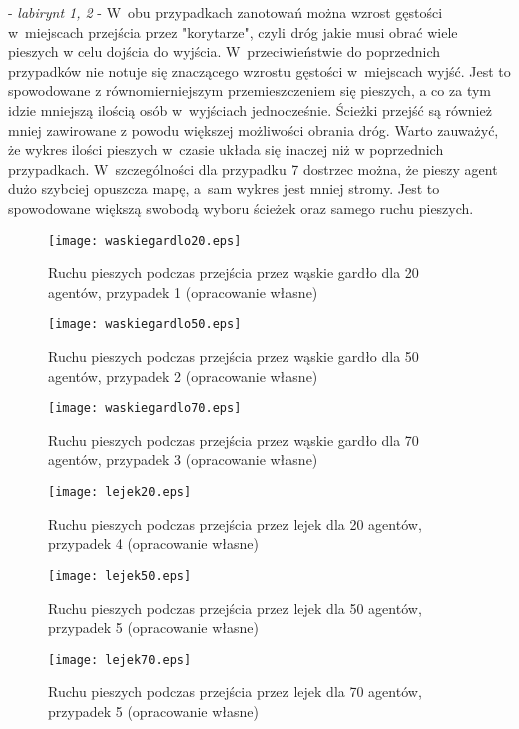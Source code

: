 - \textit{labirynt 1, 2} - W~obu przypadkach zanotowań można wzrost gęstości w~miejscach przejścia przez "korytarze", czyli dróg jakie musi obrać wiele pieszych w celu dojścia do wyjścia. W~przeciwieństwie do poprzednich przypadków nie notuje się znaczącego wzrostu gęstości w~miejscach wyjść. Jest to spowodowane z równomierniejszym przemieszczeniem się pieszych, a co za tym idzie mniejszą ilością osób w~wyjściach jednocześnie. Ścieżki przejść są również mniej zawirowane z powodu większej możliwości obrania dróg. Warto zauważyć, że wykres ilości pieszych w~czasie układa się inaczej niż w poprzednich przypadkach. W~szczególności dla przypadku 7 dostrzec można, że pieszy agent dużo szybciej opuszcza mapę, a~sam wykres jest mniej stromy. Jest to spowodowane większą swobodą wyboru ścieżek oraz samego ruchu pieszych.


\begin{figure}
\label{figure:siatka}
\centering
\texttt{[image: waskiegardlo20.eps]}
\caption{Ruchu pieszych podczas przejścia przez wąskie gardło dla 20 agentów, przypadek 1 (opracowanie własne)}
\end{figure}

\begin{figure}
\label{figure:siatka}
\centering
\texttt{[image: waskiegardlo50.eps]}
\caption{Ruchu pieszych podczas przejścia przez wąskie gardło dla 50 agentów, przypadek 2 (opracowanie własne)}
\end{figure}

\begin{figure}
\label{figure:siatka}
\centering
\texttt{[image: waskiegardlo70.eps]}
\caption{Ruchu pieszych podczas przejścia przez wąskie gardło dla 70 agentów, przypadek 3 (opracowanie własne)}
\end{figure}

\begin{figure}
\label{figure:siatka}
\centering
\texttt{[image: lejek20.eps]}
\caption{Ruchu pieszych podczas przejścia przez lejek dla 20 agentów, przypadek 4 (opracowanie własne)}
\end{figure}

\begin{figure}
\label{figure:siatka}
\centering
\texttt{[image: lejek50.eps]}
\caption{Ruchu pieszych podczas przejścia przez lejek dla 50 agentów, przypadek 5 (opracowanie własne)}
\end{figure}

\begin{figure}
\label{figure:siatka}
\centering
\texttt{[image: lejek70.eps]}
\caption{Ruchu pieszych podczas przejścia przez lejek dla 70 agentów, przypadek 5 (opracowanie własne)}
\end{figure}


